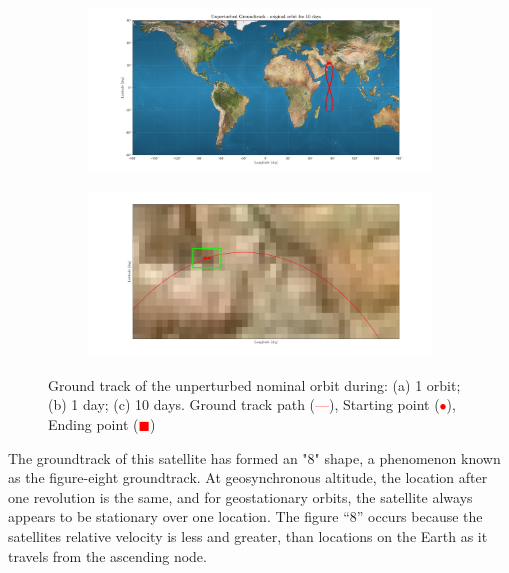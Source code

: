 \documentclass{article}
\newcommand{\reddashedline}{\textcolor{red}{---}}
\begin{document}
\begin{figure}[ht]
	\vspace{1cm} %
	\begin{subfigure}[b]{0.45\textwidth}
		\includegraphics[width=\textwidth]{ug10d.png}
		\caption{}
		\label{fig:1c}
	\end{subfigure}
	\hfill
	\begin{subfigure}[b]{0.45\textwidth}
		\includegraphics[width=\textwidth]{ugstartend.png}
		\caption{}
		\label{fig:1d}
	\end{subfigure}
	\caption{Ground track of the unperturbed nominal orbit during: (a) 1 orbit; (b) 1 day; (c) 10 days. Ground track path (\reddashedline), Starting point (\textcolor{red}{$\bullet$}), Ending point (\textcolor{red}{$\blacksquare$})
	}	
	
\end{figure}
The groundtrack of this satellite has formed an "8" shape, a phenomenon known as the figure-eight groundtrack. At geosynchronous altitude, the location after one revolution is the same, and for geostationary  orbits, the satellite always appears to be stationary over one location. The figure “8” occurs because the satellites relative velocity is less and greater, than locations on the Earth as it travels from the ascending node. 

	
\end{document}

